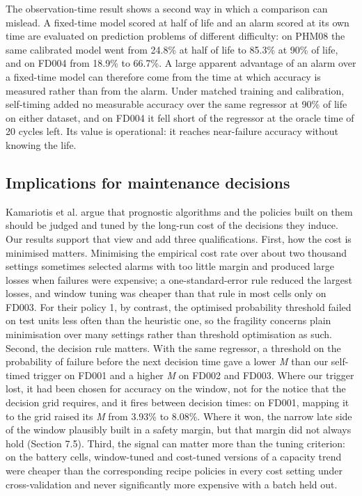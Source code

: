 \documentclass[a4paper,fleqn,doubleblind]{cas-dc}
\begin{document}
The observation-time result shows a second way in which a comparison can mislead. A fixed-time model scored at half of life and an alarm scored at its own time are evaluated on prediction problems of different difficulty: on PHM08 the same calibrated model went from 24.8\% at half of life to 85.3\% at 90\% of life, and on FD004 from 18.9\% to 66.7\%. A large apparent advantage of an alarm over a fixed-time model can therefore come from the time at which accuracy is measured rather than from the alarm. Under matched training and calibration, self-timing added no measurable accuracy over the same regressor at 90\% of life on either dataset, and on FD004 it fell short of the regressor at the oracle time of 20 cycles left. Its value is operational: it reaches near-failure accuracy without knowing the life.

\subsection{Implications for maintenance decisions}

Kamariotis et al. \cite{kamariotis2024} argue that prognostic algorithms and the policies built on them should be judged and tuned by the long-run cost of the decisions they induce. Our results support that view and add three qualifications. First, how the cost is minimised matters. Minimising the empirical cost rate over about two thousand settings sometimes selected alarms with too little margin and produced large losses when failures were expensive; a one-standard-error rule reduced the largest losses, and window tuning was cheaper than that rule in most cells only on FD003. For their policy 1, by contrast, the optimised probability threshold failed on test units less often than the heuristic one, so the fragility concerns plain minimisation over many settings rather than threshold optimisation as such. Second, the decision rule matters. With the same regressor, a threshold on the probability of failure before the next decision time gave a lower \textit{M} than our self-timed trigger on FD001 and a higher \textit{M} on FD002 and FD003. Where our trigger lost, it had been chosen for accuracy on the window, not for the notice that the decision grid requires, and it fires between decision times: on FD001, mapping it to the grid raised its \textit{M} from 3.93\% to 8.08\%. Where it won, the narrow late side of the window plausibly built in a safety margin, but that margin did not always hold (Section 7.5). Third, the signal can matter more than the tuning criterion: on the battery cells, window-tuned and cost-tuned versions of a capacity trend were cheaper than the corresponding recipe policies in every cost setting under cross-validation and never significantly more expensive with a batch held out.
\end{document}
